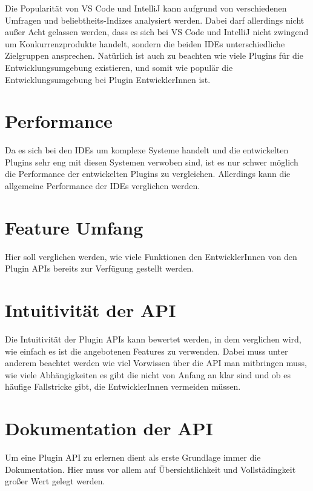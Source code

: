 Die Popularität von VS Code und IntelliJ kann aufgrund
von verschiedenen Umfragen und beliebtheits-Indizes 
analysiert werden. Dabei darf allerdings nicht außer
Acht gelassen werden, dass es sich bei VS Code und
IntelliJ nicht zwingend um Konkurrenzprodukte handelt,
sondern die beiden IDEs unterschiedliche Zielgruppen ansprechen.
Natürlich ist auch zu beachten wie viele Plugins 
für die Entwicklungsumgebung existieren, und somit wie 
populär die Entwicklungsumgebung bei Plugin EntwicklerInnen ist. 


\section{Performance}
\label{sec:Kriterien_Performance}

Da es sich bei den IDEs um komplexe Systeme handelt und die 
entwickelten Plugins sehr eng mit diesen Systemen verwoben sind,
ist es nur schwer möglich die Performance der entwickelten
Plugins zu vergleichen. Allerdings kann die allgemeine
Performance der IDEs verglichen werden.


\section{Feature Umfang}
\label{sec:Kriterien_FeatureUmfang}

Hier soll verglichen werden, wie viele Funktionen
den EntwicklerInnen von den Plugin APIs 
bereits zur Verfügung gestellt werden.


\section{Intuitivität der API}
\label{sec:Kriterien_Intuitivität}

Die Intuitivität der Plugin APIs kann bewertet werden,
in dem verglichen wird, wie einfach es ist die
angebotenen Features zu verwenden.
Dabei muss unter anderem beachtet werden wie viel Vorwissen über die
API man mitbringen muss, wie viele Abhängigkeiten es
gibt die nicht von Anfang an klar sind und ob es 
häufige Fallstricke gibt, die EntwicklerInnen vermeiden müssen.


\section{Dokumentation der API}
\label{sec:Kriterien_Dokumentation}

Um eine Plugin API zu erlernen dient als erste Grundlage
immer die Dokumentation. Hier muss vor allem
auf Übersichtlichkeit und Vollstädingkeit großer Wert
gelegt werden.


